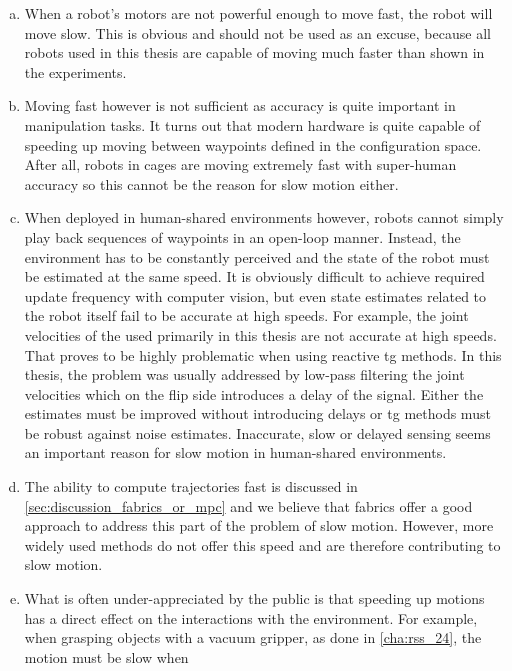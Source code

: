\begin{enumerate}[(a)]
  \item When a robot's motors are not powerful enough to
    move fast, the robot will move slow. This is obvious and
    should not be used as an excuse, because all robots used
    in this thesis are capable of moving much faster than
    shown in the experiments. 
  \item Moving fast however is not sufficient as accuracy
    is quite important in manipulation tasks. It turns out
    that modern hardware is quite capable of speeding up
    moving between waypoints defined in the configuration
    space. After all,
    robots in cages are moving extremely fast with
    super-human accuracy so this cannot be the reason for
    slow motion either.
  \item When deployed in human-shared environments however,
    robots cannot simply play back sequences of waypoints in
    an open-loop manner. Instead, the environment has to be
    constantly perceived and the state of the robot must be
    estimated at the same speed. It is obviously difficult
    to achieve required update frequency with computer
    vision, but even state estimates related to the robot
    itself fail to be accurate at high speeds. For example,
    the joint velocities of the \panda{} used primarily
    in this thesis are not accurate at high speeds. That
    proves to be highly problematic when using reactive
    \ac{tg} methods. In this thesis, the problem was usually
    addressed by low-pass filtering the joint velocities
    which on the flip side introduces a delay of the signal.
    Either the estimates must be improved without
    introducing delays or \ac{tg} methods must be robust
    against noise estimates. Inaccurate, slow or delayed
    sensing seems an important reason for slow motion in
    human-shared environments.
  \item The ability to compute trajectories fast is
    discussed in \cref{sec:discussion_fabrics_or_mpc} and we
    believe that \ac{fabrics} offer a good approach to
    address this part of the problem of slow motion.
    However, more widely used methods do not offer this
    speed and are therefore contributing to slow motion.
  \item What is often under-appreciated by the public is
    that speeding up motions has a direct effect on the
    interactions with the environment. For example, when
    grasping objects with a vacuum gripper, as done in 
    \cref{cha:rss_24}, the motion must be slow when

\end{enumerate}
